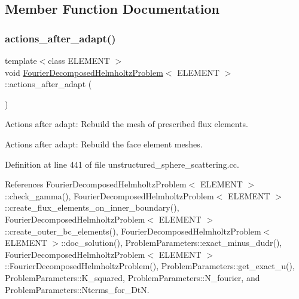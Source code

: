 \subsection{Member Function Documentation}
\mbox{\label{classFourierDecomposedHelmholtzProblem_a3258e3817d8747aac0409eca1a24d14b}} 
\subsubsection{\texorpdfstring{actions\+\_\+after\+\_\+adapt()}{actions\_after\_adapt()}}
{\footnotesize\ttfamily template$<$class E\+L\+E\+M\+E\+NT $>$ \\
void \hyperlink{classFourierDecomposedHelmholtzProblem}{Fourier\+Decomposed\+Helmholtz\+Problem}$<$ E\+L\+E\+M\+E\+NT $>$\+::actions\+\_\+after\+\_\+adapt (\begin{DoxyParamCaption}{ }\end{DoxyParamCaption})}



Actions after adapt\+: Rebuild the mesh of prescribed flux elements. 

Actions after adapt\+: Rebuild the face element meshes. 

Definition at line 441 of file unstructured\+\_\+sphere\+\_\+scattering.\+cc.



References Fourier\+Decomposed\+Helmholtz\+Problem$<$ E\+L\+E\+M\+E\+N\+T $>$\+::check\+\_\+gamma(), Fourier\+Decomposed\+Helmholtz\+Problem$<$ E\+L\+E\+M\+E\+N\+T $>$\+::create\+\_\+flux\+\_\+elements\+\_\+on\+\_\+inner\+\_\+boundary(), Fourier\+Decomposed\+Helmholtz\+Problem$<$ E\+L\+E\+M\+E\+N\+T $>$\+::create\+\_\+outer\+\_\+bc\+\_\+elements(), Fourier\+Decomposed\+Helmholtz\+Problem$<$ E\+L\+E\+M\+E\+N\+T $>$\+::doc\+\_\+solution(), Problem\+Parameters\+::exact\+\_\+minus\+\_\+dudr(), Fourier\+Decomposed\+Helmholtz\+Problem$<$ E\+L\+E\+M\+E\+N\+T $>$\+::\+Fourier\+Decomposed\+Helmholtz\+Problem(), Problem\+Parameters\+::get\+\_\+exact\+\_\+u(), Problem\+Parameters\+::\+K\+\_\+squared, Problem\+Parameters\+::\+N\+\_\+fourier, and Problem\+Parameters\+::\+Nterms\+\_\+for\+\_\+\+DtN.

